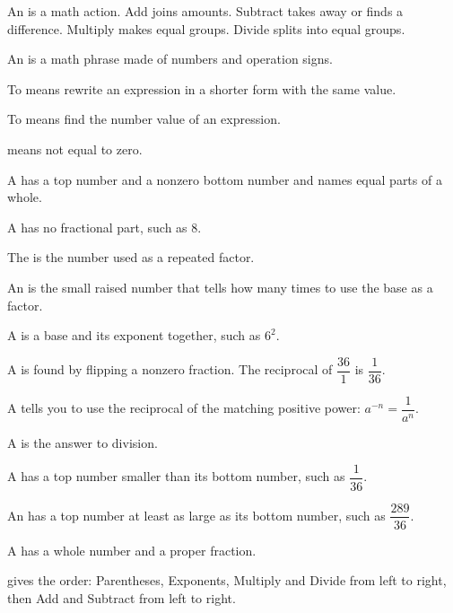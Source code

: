 \begin{words}
  \item An is a math action. Add joins amounts. Subtract takes
    away or finds a difference. Multiply makes equal groups. Divide splits into
    equal groups.
  \item An is a math phrase made of numbers and operation signs.
  \item To means rewrite an expression in a shorter form with the
    same value.
  \item To means find the number value of an expression.
  \item {}means not equal to zero.
  \item A has a top number and a nonzero bottom number and names
    equal parts of a whole.
  \item A has no fractional part, such as 8.
  \item The is the number used as a repeated factor.
  \item An is the small raised number that tells how many times to
    use the base as a factor.
  \item A is a base and its exponent together, such as $6^{2}$.
  \item A is found by flipping a nonzero fraction. The
    reciprocal of $\dfrac{36}{1}$ is $\dfrac{1}{36}$.
  \item A tells you to use the reciprocal of the matching
    positive power: $a^{-n} = \dfrac{1}{a^{n}}$.
  \item A is the answer to division.
  \item A has a top number smaller than its bottom number,
    such as $\dfrac{1}{36}$.
  \item An has a top number at least as large as its
    bottom number, such as $\dfrac{289}{36}$.
  \item A has a whole number and a proper fraction.
  \item {}gives the order: Parentheses, Exponents, Multiply and Divide
    from left to right, then Add and Subtract from left to right.
\end{words}

